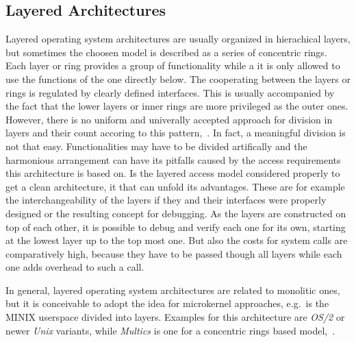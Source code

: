 \subsection{Layered Architectures}
Layered operating system architectures are usually organized in hierachical layers, but sometimes the choosen model is described as a series of concentric rings.
Each layer or ring provides a group of functionality while a it is only allowed to use the functions of the one directly below. 
The cooperating between the layers or rings is regulated by clearly defined interfaces\cite{brause2017betriebssysteme}.
This is usually accompanied by the fact that the lower layers or inner rings are more privileged as the outer ones.
However, there is no uniform and univerally accepted approach for division in layers and their count accoring to this pattern\cite{glatz2015betriebssysteme},~\cite{tanenbaum-modern-operating-systems}.
In fact, a meaningful division is not that easy.
Functionalities may have to be divided artifically and the harmonious arrangement can have its pitfalls caused by the access requirements this architecture is based on.
Is the layered access model considered properly to get a clean architecture, it that can unfold its advantages.
These are for example the interchangeability of the layers if they and their interfaces were properly designed or the resulting concept for debugging.
As the layers are constructed on top of each other, it is possible to debug  and verify each one for its own, starting at the lowest layer up to the top most one\cite{silberschatz2009operating}.
But also the costs for system calls are comparatively high, because they have to be passed though all layers while each one adds overhead to such a call\cite{silberschatz2009operating}.  

In general, layered operating system architectures are related to monolitic ones, but it is conceivable to adopt the idea for microkernel approaches, e.g.\ is the MINIX userspace divided into layers. 
Examples for this architecture are \textit{OS/2} or newer \textit{Unix} variants, while \textit{Multics} is one for a concentric rings based model\cite{glatz2015betriebssysteme},~\cite{tanenbaum-modern-operating-systems}.




